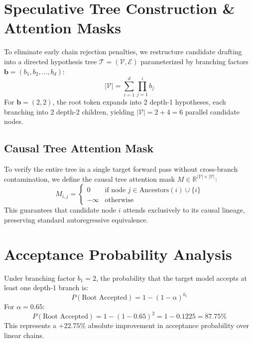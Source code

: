 \documentclass[11pt,a4paper]{article}
\begin{document}
\section{Speculative Tree Construction \& Attention Masks}
To eliminate early chain rejection penalties, we restructure candidate drafting into a directed hypothesis tree $\mathcal{T} = (\mathcal{V}, \mathcal{E})$ parameterized by branching factors $\mathbf{b} = (b_1, b_2, \dots, b_d)$:
\begin{equation}
|\mathcal{V}| = \sum_{i=1}^d \prod_{j=1}^i b_j
\end{equation}
For $\mathbf{b} = (2, 2)$, the root token expands into $2$ depth-1 hypotheses, each branching into $2$ depth-2 children, yielding $|\mathcal{V}| = 2 + 4 = 6$ parallel candidate nodes.

\subsection{Causal Tree Attention Mask}
To verify the entire tree in a single target forward pass without cross-branch contamination, we define the causal tree attention mask $M \in \mathbb{R}^{|\mathcal{V}| \times |\mathcal{V}|}$:
\begin{equation}
M_{i, j} = \begin{cases} 0 & \text{if node } j \in \text{Ancestors}(i) \cup \{i\} \\ -\infty & \text{otherwise} \end{cases}
\end{equation}
This guarantees that candidate node $i$ attends exclusively to its causal lineage, preserving standard autoregressive equivalence.

\section{Acceptance Probability Analysis}
Under branching factor $b_1 = 2$, the probability that the target model accepts at least one depth-1 branch is:
\begin{equation}
P(\text{Root Accepted}) = 1 - (1 - \alpha)^{b_1}
\end{equation}
For $\alpha = 0.65$:
\begin{equation}
P(\text{Root Accepted}) = 1 - (1 - 0.65)^2 = 1 - 0.1225 = \mathbf{87.75\%}
\end{equation}
This represents a $+22.75\%$ absolute improvement in acceptance probability over linear chains.
\end{document}
